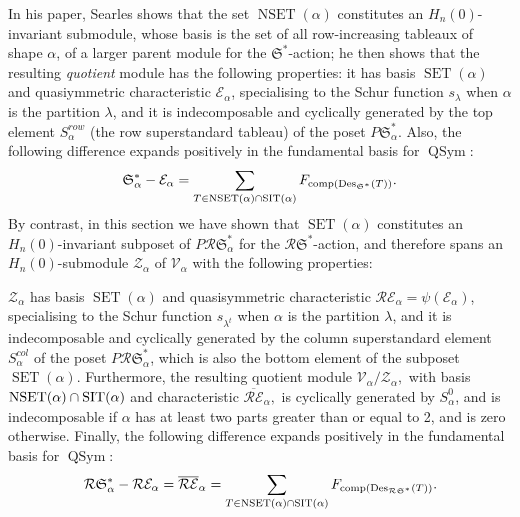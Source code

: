 \documentclass[12pt,letterpaper]{amsart}
\theoremstyle{definition}
\DeclareMathOperator{\comp}{comp}
\newcommand{\dI}{\mathfrak{S}^*}
\newcommand{\rdI}{\mathcal{R}\mathfrak{S}^*}
\DeclareMathOperator{\QSym}{QSym}
\DeclareMathOperator{\Des}{Des}
\newcommand{\SET}{\ensuremath{\operatorname{SET}}} \newcommand{\NSET}{\ensuremath{\operatorname{NSET}}}\newcommand{\SRCT}{\ensuremath{\operatorname{SRCT}}}
\newcommand{\hn}{H_n(0)}
\begin{document}
In his paper, Searles shows that the set $\NSET(\alpha)$ constitutes an $\hn$-invariant 
  submodule, whose basis is the set of all row-increasing tableaux of shape $\alpha$, of a larger parent module for the $\dI$-action; he then shows that the resulting \textit{quotient} module has the following properties: 
it has basis $\SET(\alpha)$ and 
 quasiymmetric characteristic $\mathcal{E}_\alpha$, specialising to the Schur function $s_\lambda$ when $\alpha$ is the partition $\lambda$, and 
it is indecomposable and cyclically generated by the top element $ S^{row}_\alpha$ (the row superstandard tableau) of the poset $P\dI_\alpha$. 
 Also, the following difference expands positively in the fundamental basis for $\QSym$:
\[ \dI_\alpha-\mathcal{E}_\alpha=\sum_{T\in \NSET(\alpha)\cap\SIT(\alpha)}  F_{\comp(\Des_{\dI}(T))}.  \]
By contrast, in this section we have shown that  $\SET(\alpha)$ constitutes an $\hn$-invariant subposet of $P\rdI_\alpha$ for the $\rdI$-action, and therefore spans an $\hn$-submodule $\mathcal{Z}_\alpha$ of $\mathcal{V}_\alpha$  with the following properties: 

$\mathcal{Z}_\alpha$ has basis $\SET(\alpha)$
 and quasisymmetric characteristic $\mathcal{R}\mathcal{E}_\alpha=\psi(\mathcal{E}_\alpha)$, 
specialising to the Schur function $s_{\lambda^t}$ when $\alpha$ is the partition $\lambda$, and 
 it is indecomposable and cyclically generated by the column superstandard element  $S^{col}_\alpha$ of the poset $P\rdI_\alpha$, which is also the bottom element of the subposet $\SET(\alpha)$. Furthermore, 
 the resulting quotient module $\mathcal{V}_\alpha/\mathcal{Z}_\alpha,$ with basis $\NSET(\alpha)\cap\SIT(\alpha)$ and characteristic 
$\overline{\mathcal{R}\mathcal{E}}_\alpha,$ is cyclically generated by $S^0_\alpha$, and is indecomposable if $\alpha$ has at least two parts greater than or equal to 2, and is zero otherwise. Finally, 
the following difference expands positively in the fundamental basis for $\QSym$:
\[\rdI_\alpha-\mathcal{R}\mathcal{E}_\alpha=\overline{\mathcal{R}{\mathcal{E}}}_{\alpha}= \sum_{T\in \NSET(\alpha)\cap\SIT(\alpha)} F_{\mathrm{comp}(\Des_{\rdI}(T))}.\]
\end{document}
